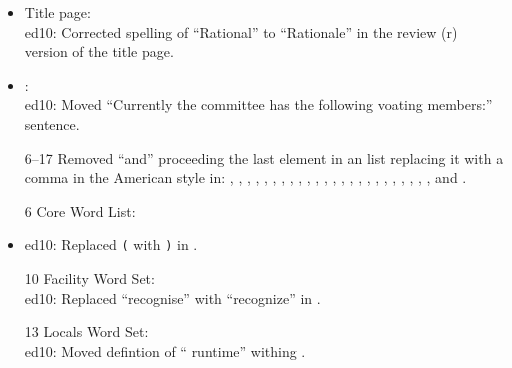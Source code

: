 	\begin{itemize}
	\item Title page: \\
		\textsf{ed10}: Corrected spelling of ``Rational'' to ``Rationale''
			in the review (r) version of the title page.

	\item {}: \\
		\textsf{ed10}: Moved ``Currently the committee has the
			following voating members:'' sentence.

	\item[6--17] Removed ``and'' proceeding the last element in an list
		replacing it with a comma in the American style in:
			,
			,
			,
			,
			,
			,
			,
			, 
			,
			,
			,
			,
			,
			,
			,
			,
			,
			,
			,
			,
			,
			,
			,
			,
			 and
			.
	
	\item[6] Core Word List: \\
		\item \textsf{ed10}: Replaced \texttt{(} with \texttt{)} in
			.

	\item[10] Facility Word Set: \\
		\textsf{ed10}: Replaced ``recognise'' with ``recognize'' in
			.

	\item[13] Locals Word Set: \\
		\textsf{ed10}: Moved defintion of ``  runtime'' withing .
	\end{itemize}

\endinput
 
